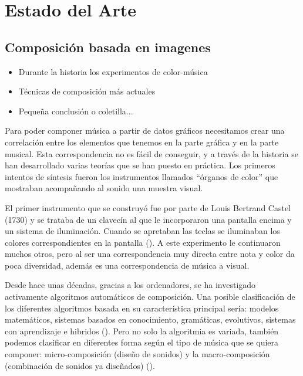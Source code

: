\section{Estado del Arte}
\label{sec:estadodelarte}



\subsection{Composición basada en imagenes}


\begin{itemize}
\item Durante la historia los experimentos de color-música
\item Técnicas de composición más actuales
\item Pequeña conclusión o coletilla...
\end{itemize}

Para poder componer música a partir de datos gráficos necesitamos crear una correlación entre los elementos que tenemos en la parte gráfica y en la parte musical. Esta correspondencia no es fácil de conseguir, y a través de la historia se han desarrollado varias teorías que se han puesto en práctica. Los primeros intentos de síntesis fueron los instrumentos llamados ``órganos de color'' que mostraban acompañando al sonido una muestra visual.

El primer instrumento que se construyó fue por parte de Louis Bertrand Castel (1730) y se trataba de un clavecín al que le incorporaron una pantalla encima y un sistema de iluminación. Cuando se apretaban las teclas se iluminaban los colores correspondientes en la pantalla (\cite{organosColor}). A este experimento le continuaron muchos otros, pero al ser una correspondencia muy directa entre nota y color da poca diversidad, además es una correspondencia de música a visual.

Desde hace unas décadas, gracias a los ordenadores, se ha investigado activamente algoritmos automáticos de composición. Una posible clasificación de los diferentes algoritmos basada en su característica principal sería: modelos matemáticos, sistemas basados en conocimiento, gramáticas, evolutivos, sistemas con aprendizaje e hibridos (\cite{AIMethodsForComposition}). Pero no solo la algoritmia es variada, también podemos clasificar en diferentes forma según el tipo de música que se quiera componer: micro-composición (diseño de sonidos) y la macro-composición (combinación de sonidos ya diseñados) (\cite{AudioVisualSurvey}).

